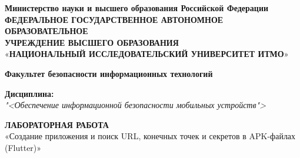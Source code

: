 \thispagestyle{empty}
\begin{center}
    \begin{sloppypar}
        {\fontsize{12}{14}\selectfont
        \textbf{{Министерство науки и высшего образования Российской Федерации}}\\
        \vspace{10pt}
        \textbf{ФЕДЕРАЛЬНОЕ ГОСУДАРСТВЕННОЕ АВТОНОМНОЕ ОБРАЗОВАТЕЛЬНОЕ\\УЧРЕЖДЕНИЕ ВЫСШЕГО ОБРАЗОВАНИЯ}\\
        «\textbf{НАЦИОНАЛЬНЫЙ ИССЛЕДОВАТЕЛЬСКИЙ УНИВЕРСИТЕТ ИТМО}»}
    \end{sloppypar}
    \vspace{30pt}

    \textbf{Факультет безопасности информационных технологий}
\end{center}

\vfill

\begin{center}
    \textbf{Дисциплина:} \\
         \vspace{5pt}
    \textit{"<Обеспечение информационной безопасности мобильных устройств">}

    \vspace{40pt}

    
    \textbf{ЛАБОРАТОРНАЯ РАБОТА }\\
    «Создание приложения и поиск URL, конечных точек и секретов в APK-файлах (Flutter)»
    \vspace{10pt}

\end{center}

